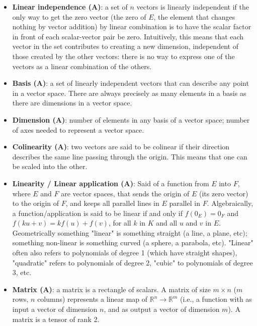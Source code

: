 \documentclass{article}
\begin{document}
\begin{itemize}
    \item \textbf{Linear independence (A)}: a set of $n$ vectors is linearly independent if the only way to get the zero vector (the zero of $E$, the element that changes nothing by vector addition) by linear combination is to have the scalar factor in front of each scalar-vector pair be zero. Intuitively, this means that each vector in the set contributes to creating a new dimension, independent of those created by the other vectors: there is no way to express one of the vectors as a linear combination of the others.
    
    \item \textbf{Basis (A)}: a set of linearly independent vectors that can describe any point in a vector space. There are always precisely as many elements in a basis as there are dimensions in a vector space.
    
    \item \textbf{Dimension (A)}: number of elements in any basis of a vector space; number of axes needed to represent a vector space.
    
    \item \textbf{Colinearity (A)}: two vectors are said to be colinear if their direction describes the same line passing through the origin. This means that one can be scaled into the other.
    
    \item \textbf{Linearity / Linear application (A)}: Said of a function from $E$ into $F$, where $E$ and $F$ are vector spaces, that sends the origin of $E$ (its zero vector) to the origin of $F$, and keeps all parallel lines in $E$ parallel in $F$. Algebraically, a function/application is said to be linear if and only if $f(0_E) = 0_F$ and $f(ku+v) = kf(u) + f(v)$, for all $k$ in $K$ and all $u$ and $v$ in $E$. Geometrically something "linear" is something straight (a line, a plane, etc); something non-linear is something curved (a sphere, a parabola, etc). "Linear" often also refers to polynomials of degree 1 (which have straight shapes), "quadratic" refers to polynomials of degree 2, "cubic" to polynomials of degree 3, etc.
    
    \item \textbf{Matrix (A)}: a matrix is a rectangle of scalars. A matrix of size $m \times n$ ($m$ rows, $n$ columns) represents a linear map of $\mathbb{R}^n \rightarrow \mathbb{R}^m$ (i.e., a function with as input a vector of dimension $n$, and as output a vector of dimension $m$). A matrix is a tensor of rank 2.
    

\end{itemize}
\end{document}
